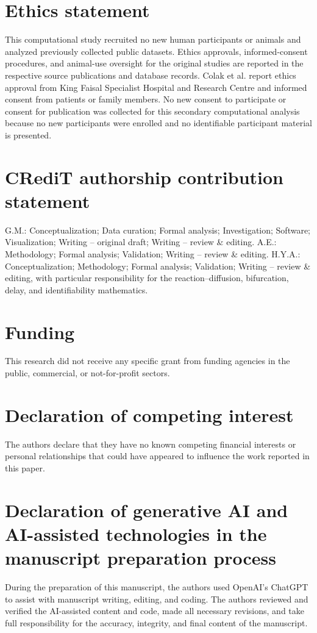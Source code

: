 \documentclass[preprint,11pt]{elsarticle}
\begin{document}
\section*{Ethics statement}
This computational study recruited no new human participants or animals and analyzed previously collected public datasets. Ethics approvals, informed-consent procedures, and animal-use oversight for the original studies are reported in the respective source publications and database records. Colak et al. \cite{Colak2016} report ethics approval from King Faisal Specialist Hospital and Research Centre and informed consent from patients or family members. No new consent to participate or consent for publication was collected for this secondary computational analysis because no new participants were enrolled and no identifiable participant material is presented.


\section*{CRediT authorship contribution statement}
G.M.: Conceptualization; Data curation; Formal analysis; Investigation; Software; Visualization; Writing -- original draft; Writing -- review \& editing. A.E.: Methodology; Formal analysis; Validation; Writing -- review \& editing. H.Y.A.: Conceptualization; Methodology; Formal analysis; Validation; Writing -- review \& editing, with particular responsibility for the reaction--diffusion, bifurcation, delay, and identifiability mathematics.

\section*{Funding}
This research did not receive any specific grant from funding agencies in the public, commercial, or not-for-profit sectors.

\section*{Declaration of competing interest}
The authors declare that they have no known competing financial interests or personal relationships that could have appeared to influence the work reported in this paper.

\section*{Declaration of generative AI and AI-assisted technologies in the manuscript preparation process}
During the preparation of this manuscript, the authors used OpenAI's ChatGPT to assist with manuscript writing, editing, and coding. The authors reviewed and verified the AI-assisted content and code, made all necessary revisions, and take full responsibility for the accuracy, integrity, and final content of the manuscript.
\end{document}
